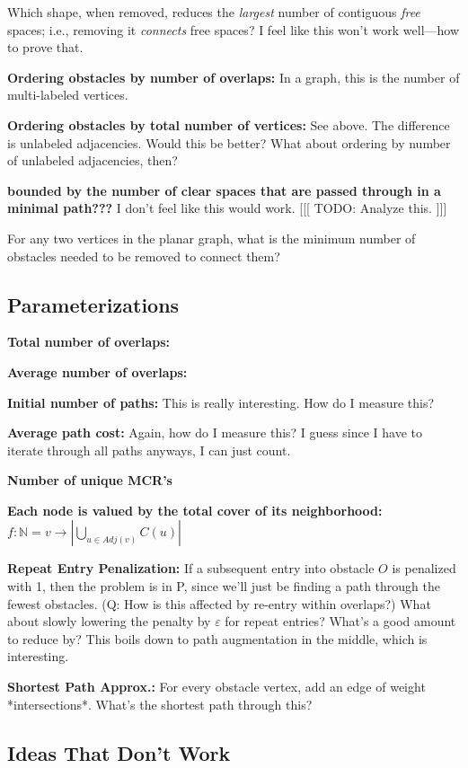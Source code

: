 \documentclass{amsart}
\begin{document}
{Which shape, when removed, reduces the 
\emph{largest} number of contiguous \emph{free} spaces; i.e., removing it \emph{connects} free spaces? I feel like this won't work well---how to prove that.

\textbf{Ordering obstacles by number of overlaps:} In a graph, this is the number of multi-labeled vertices.

\textbf{Ordering obstacles by total number of vertices:} See above. The difference is unlabeled adjacencies. Would this be better? What about ordering by number of unlabeled adjacencies, then?

\textbf{bounded by the number of clear spaces that are passed through in a minimal path???} I don't feel like this would work. [[[ TODO: Analyze this. ]]]

For any two vertices in the planar graph, what is the minimum number of obstacles needed to be removed to connect them?

\subsection{Parameterizations}

\textbf{Total number of overlaps:}

\textbf{Average number of overlaps:}

\textbf{Initial number of paths:} This is really interesting. How do I measure this?

\textbf{Average path cost:} Again, how do I measure this? I guess since I have to iterate through all paths anyways, I can just count.

\textbf{Number of unique MCR's}

\textbf{Each node is valued by the total cover of its neighborhood:} $f: \mathbb{N} = v \to |\bigcup_{u \in Adj(v)} C(u) |$

\textbf{Repeat Entry Penalization:} If a subsequent entry into obstacle $O$ is penalized with 1, then the problem is in P, since we'll just be finding a path through the fewest obstacles. (Q: How is this affected by re-entry within overlaps?) What about slowly lowering the penalty by $\varepsilon$ for repeat entries? What's a good amount to reduce by? This boils down to path augmentation in the middle, which is interesting.

\textbf{Shortest Path Approx.:} For every obstacle vertex, add an edge of weight *intersections*. What's the shortest path through this?

\subsection{Ideas That Don't Work}

}
\end{document}
